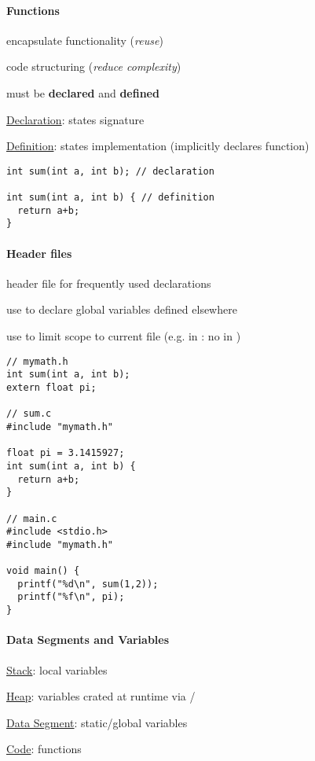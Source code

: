 \paragraph{Functions}
\begin{items}
  \item encapsulate functionality (\emph{reuse})
  \item code structuring (\emph{reduce complexity})
  \item must be \textbf{declared} and \textbf{defined}
  \item \underline{Declaration}: states signature
  \item \underline{Definition}: states implementation (implicitly declares function)
\end{items}
\begin{lstlisting}[style=customc]
int sum(int a, int b); // declaration

int sum(int a, int b) { // definition
  return a+b;
}
\end{lstlisting}

\paragraph{Header files}
\begin{items}
  \item header file for frequently used declarations
  \item use  to declare global variables defined elsewhere
  \item use  to limit scope to current file (e.g.  in : no  in )
  \begin{lstlisting}[style=customc]
// mymath.h
int sum(int a, int b);
extern float pi;

// sum.c
#include "mymath.h"

float pi = 3.1415927;
int sum(int a, int b) {
  return a+b;
}

// main.c
#include <stdio.h>
#include "mymath.h"

void main() {
  printf("%d\n", sum(1,2));
  printf("%f\n", pi);
}
  \end{lstlisting}
\end{items}

\paragraph{Data Segments and Variables}
\begin{items}
  \item \underline{Stack}: local variables
  \item \underline{Heap}: variables crated at runtime via /
  \item \underline{Data Segment}: static/global variables
  \item \underline{Code}: functions
\end{items}

